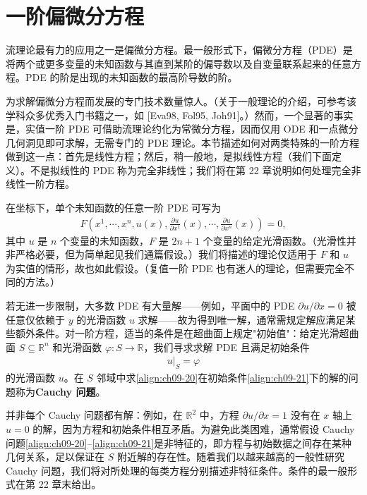 \documentclass[../../main.tex]{subfiles}
\begin{document}
\section{一阶偏微分方程}\label{section:ch09-一阶偏微分方程}

流理论最有力的应用之一是偏微分方程。最一般形式下，偏微分方程（PDE）是将两个或更多变量的未知函数与其直到某阶的偏导数以及自变量联系起来的任意方程。PDE 的阶是出现的未知函数的最高阶导数的阶。

为求解偏微分方程而发展的专门技术数量惊人。（关于一般理论的介绍，可参考该学科众多优秀入门书籍之一，如 [Eva98, Fol95, Joh91]。）然而，一个显著的事实是，实值一阶 PDE 可借助流理论约化为常微分方程，因而仅用 ODE 和一点微分几何洞见即可求解，无需专门的 PDE 理论。本节描述如何对两类特殊的一阶方程做到这一点：首先是线性方程；然后，稍一般地，是拟线性方程（我们下面定义）。不是拟线性的 PDE 称为完全非线性；我们将在第 22 章说明如何处理完全非线性一阶方程。

在坐标下，单个未知函数的任意一阶 PDE 可写为
\begin{align}
F\left(x^1,\cdots ,x^n,u(x),\frac{\partial u}{\partial x^1}(x),\cdots ,\frac{\partial u}{\partial x^n}(x)\right)=0, \label{align:ch09-20}
\end{align}
其中 $u$ 是 $n$ 个变量的未知函数，$F$ 是 $2n+1$ 个变量的给定光滑函数。（光滑性并非严格必要，但为简单起见我们通篇假设。）我们将描述的理论仅适用于 $F$ 和 $u$ 为实值的情形，故也如此假设。（复值一阶 PDE 也有迷人的理论，但需要完全不同的方法。）

若无进一步限制，大多数 PDE 有大量解——例如，平面中的 PDE $\partial u/\partial x=0$ 被任意仅依赖于 $y$ 的光滑函数 $u$ 求解——故为得到唯一解，通常需规定解应满足某些额外条件。对一阶方程，适当的条件是在超曲面上规定"初始值"：给定光滑超曲面 $S\subseteq\mathbb{R}^n$ 和光滑函数 $\varphi\colon S\to\mathbb{R}$，我们寻求求解 PDE 且满足初始条件
\begin{align}
u|_S=\varphi \label{align:ch09-21}
\end{align}
的光滑函数 $u$。在 $S$ 邻域中求\eqref{align:ch09-20}在初始条件\eqref{align:ch09-21}下的解的问题称为\textbf{Cauchy 问题}。

并非每个 Cauchy 问题都有解：例如，在 $\mathbb{R}^2$ 中，方程 $\partial u/\partial x=1$ 没有在 $x$ 轴上 $u=0$ 的解，因为方程和初始条件相互矛盾。为避免此类困难，通常假设 Cauchy 问题\eqref{align:ch09-20}--\eqref{align:ch09-21}是非特征的，即方程与初始数据之间存在某种几何关系，足以保证在 $S$ 附近解的存在性。随着我们以越来越高的一般性研究 Cauchy 问题，我们将对所处理的每类方程分别描述非特征条件。条件的最一般形式在第 22 章末给出。
\end{document}
